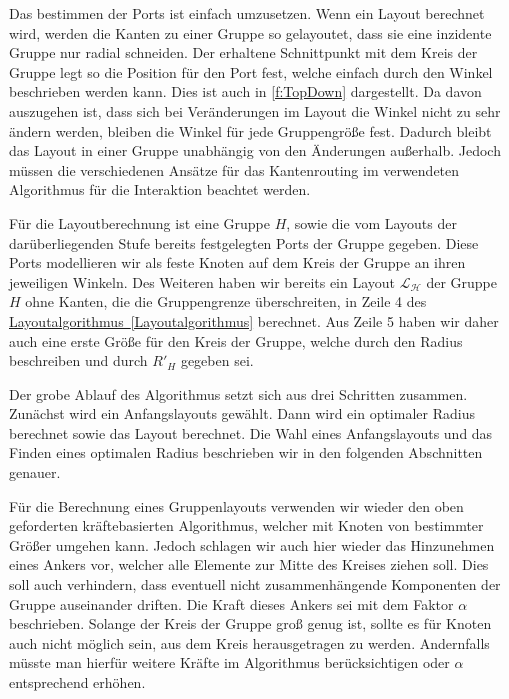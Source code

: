 Das bestimmen der Ports ist einfach umzusetzen. 
Wenn ein Layout berechnet wird, werden die Kanten zu einer Gruppe so gelayoutet, dass sie eine inzidente Gruppe nur radial schneiden.
Der erhaltene Schnittpunkt mit dem Kreis der Gruppe legt so die Position für den Port fest, welche einfach durch den Winkel beschrieben werden kann. 
Dies ist auch in \autoref{f:TopDown} dargestellt.
Da davon auszugehen ist, dass sich bei Veränderungen im Layout die Winkel nicht zu sehr ändern werden, bleiben die Winkel für jede Gruppengröße fest.
Dadurch bleibt das Layout in einer Gruppe unabhängig von den Änderungen außerhalb. 
Jedoch müssen die verschiedenen Ansätze für das Kantenrouting im verwendeten Algorithmus für die Interaktion beachtet werden.

Für die Layoutberechnung ist eine Gruppe $H$, sowie die vom Layouts der darüberliegenden Stufe bereits festgelegten Ports der Gruppe gegeben.
Diese Ports modellieren wir als feste Knoten auf dem Kreis der Gruppe an ihren jeweiligen Winkeln.
Des Weiteren haben wir bereits ein Layout $\mathcal{L_H}$ der Gruppe $H$ ohne Kanten, die die Gruppengrenze überschreiten, in Zeile 4 des \hyperref[Layoutalgorithmus]{Layoutalgorithmus~\ref*{Layoutalgorithmus}}  berechnet. 
Aus Zeile 5 haben wir daher auch eine erste Größe für den Kreis der Gruppe, welche durch den Radius beschreiben und durch $R'_H$ gegeben sei. 

Der grobe Ablauf des Algorithmus setzt sich aus drei Schritten zusammen. Zunächst wird ein Anfangslayouts gewählt.
Dann wird ein optimaler Radius  berechnet sowie das Layout berechnet. 
Die Wahl eines Anfangslayouts und das Finden eines optimalen Radius beschrieben wir in den folgenden Abschnitten genauer. 


Für die Berechnung eines Gruppenlayouts verwenden wir wieder den oben geforderten kräftebasierten Algorithmus, welcher mit Knoten von bestimmter Größer umgehen kann. 
Jedoch schlagen wir auch hier wieder das Hinzunehmen eines Ankers vor, welcher alle Elemente zur Mitte des Kreises ziehen soll.
Dies soll auch verhindern, dass eventuell nicht zusammenhängende Komponenten der Gruppe auseinander driften. 
Die Kraft dieses Ankers sei mit dem Faktor $\alpha$ beschrieben. 
Solange der Kreis der Gruppe groß genug ist, sollte es für Knoten auch nicht möglich sein, aus dem Kreis herausgetragen zu werden. 
Andernfalls müsste man hierfür weitere Kräfte im Algorithmus berücksichtigen oder $\alpha$ entsprechend erhöhen.

